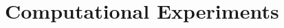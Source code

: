 \documentclass[11pt]{report}
\begin{document}






\chapter{Computational Experiments}


\end{document}

